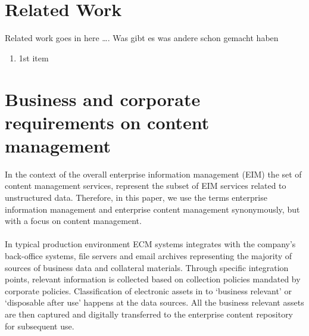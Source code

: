 \documentclass[EPiC]{easychair} %
\begin{document}
\section{Related Work}
\label{sect:relatedwork}

Related work goes in here  …. Was gibt es was andere schon gemacht haben 

\begin{enumerate}
    \item 1st item
\end{enumerate}

\section{Business and corporate requirements on content management}
\label{sect:business-requirements}

In the context of the overall enterprise information management (EIM) the set of content management services, represent the subset of EIM services related to unstructured data. Therefore, in this paper, we use the terms enterprise information management and enterprise content management synonymously, but with a focus on content management. 

\paragraph{} In typical production environment ECM systems integrates with the company’s back-office systems, file servers and email archives representing the majority of sources of business data and collateral materials. Through specific integration points, relevant information is collected based on collection policies mandated by corporate policies. Classification of electronic assets in to ‘business relevant’ or ‘disposable after use’ happens at the data sources. All the business relevant assets are then captured and digitally transferred to the enterprise content repository for subsequent use. 
\end{document}
